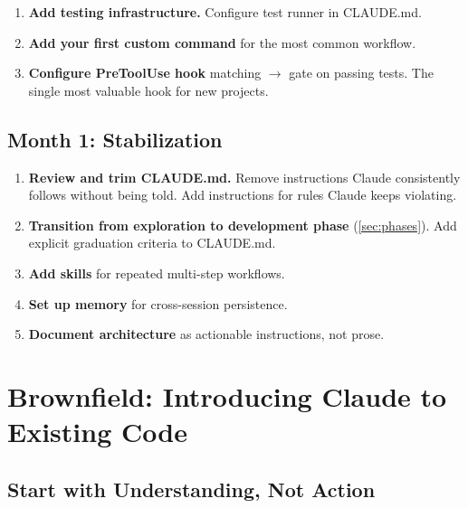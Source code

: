 \begin{enumerate}
  \item \textbf{Add testing infrastructure.}
    Configure test runner in CLAUDE.md.
  \item \textbf{Add your first custom command} for the most common workflow.
  \item \textbf{Configure PreToolUse hook} matching  $\rightarrow$
    gate  on passing tests.
    The single most valuable hook for new projects.
\end{enumerate}

\subsection{Month 1: Stabilization}

\begin{enumerate}
  \item \textbf{Review and trim CLAUDE.md.}
    Remove instructions Claude consistently follows without being told.
    Add instructions for rules Claude keeps violating.
  \item \textbf{Transition from exploration to development phase}
    (\cref{sec:phases}). Add explicit graduation criteria to CLAUDE.md.
  \item \textbf{Add skills} for repeated multi-step workflows.
  \item \textbf{Set up memory} for cross-session persistence.
  \item \textbf{Document architecture} as actionable instructions, not prose.
\end{enumerate}


\section{Brownfield: Introducing Claude to Existing Code}
\label{sec:brownfield}


\subsection{Start with Understanding, Not Action}

